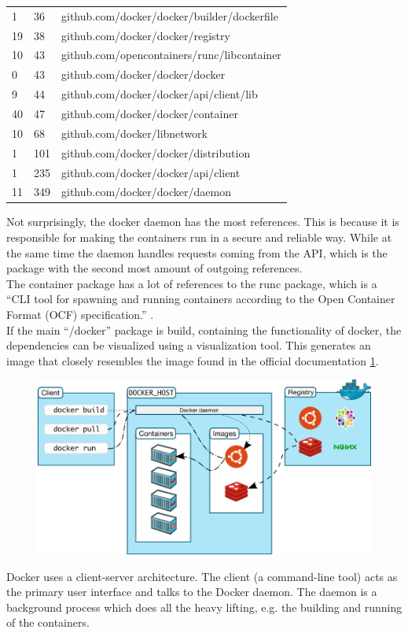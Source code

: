 \begin{tabular}{l l l}
1 & 36 & github.com/docker/docker/builder/dockerfile \\
19 & 38 & github.com/docker/docker/registry \\
10 & 43 & github.com/opencontainers/runc/libcontainer \\
0 & 43 & github.com/docker/docker/docker \\
9 & 44 & github.com/docker/docker/api/client/lib \\
40 & 47 & github.com/docker/docker/container \\
10 & 68 & github.com/docker/libnetwork \\
1 & 101 & github.com/docker/docker/distribution \\
1 & 235 & github.com/docker/docker/api/client \\
11 & 349 & github.com/docker/docker/daemon \\
\end{tabular}

Not surprisingly, the docker daemon has the most references. This is because it is responsible for making the containers run in a secure and reliable way. While at the same time the daemon handles requests coming from the API, which is the package with the second most amount of outgoing references.\\
The container package has a lot of references to the runc package, which is a ``CLI tool for spawning and running containers according to the Open Container Format (OCF) specification.'' \cite{opencontainersrunc}. \\

If the main ``/docker'' package is build, containing the functionality of docker, the dependencies can be visualized using a visualization tool. This generates an image that closely resembles the image found in the official documentation \ref{fig:dockerarchipic}.

\begin{figure}[H]
\centering
\includegraphics[scale=0.4]{4-softwarearch/images/architecture.png}
\label{fig:dockerarchipic}
\end{figure}
Docker uses a client-server architecture. The client (a command-line tool) acts as the primary user interface and talks to the Docker daemon. The daemon is a background process which does all the heavy lifting, e.g. the building and running of the containers.

